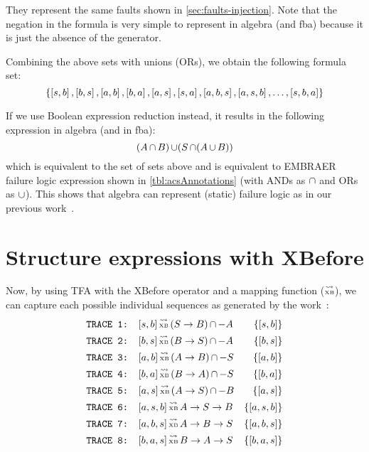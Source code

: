 \documentclass[en,twoside,onehalfspacing,phd]{risethesis}
\newcommand{\EMBRAER}{EMBRAER\xspace}
\def\xbeforeop{\ensuremath\rightarrow}
\newcommand{\xbefore}[2]{\ensuremath #1 \xbeforeop #2 }
\def\tracetoalgebra{\ensuremath\operatorname{\stackrel{\leadsto}{\text{\tiny XB}}}}
\newcommand{\listsin}[1]{\ensuremath\left[ #1 \right]}
\newcommand{\parsin}[1]{\ensuremath\left( #1 \right)}
\def\union{\ensuremath\operatorname{\cup}}
\def\inter{\ensuremath\operatorname{\cap}}
\begin{document}
They represent the same faults shown in \cref{sec:faults-injection}.
Note that the negation in the formula is very simple to represent in \ac{algebra} (and \ac{fba}) because it is just the absence of the generator.

Combining the above sets with unions (ORs), we obtain the following formula set:
%
\[
\left\{ \listsin{s,b}, \listsin{b,s}, \listsin{a,b}, \listsin{b,a}, \listsin{a,s}, \listsin{s,a}, \listsin{a,b,s}, \listsin{a,s,b},\ldots,\listsin{s,b,a} \right\}
\]

If we use Boolean expression reduction instead, it results in the following expression in \ac{algebra} (and in \ac{fba}):
\[
(A \inter B) \union (S \inter (A \union B))
\]
%
which is equivalent to the set of sets above and is equivalent to \EMBRAER failure logic expression shown in \cref{tbl:acsAnnotations} (with ANDs as $\inter$ and ORs as $\union$).
%
This shows that \ac{algebra} can represent (static) failure logic as in our previous work~\cite{DM2012}.

\section{Structure expressions with XBefore}
\label{sec:case-study-xbefore}

Now, by using TFA with the XBefore operator and a mapping function ($\tracetoalgebra$), we can capture each possible individual sequences as generated by the work~\cite{DM2012}:
%
\begin{align*}
\text{\texttt{TRACE 1: }}&[s,b] \tracetoalgebra \parsin{\xbefore{S}{B}} \inter -A & \left\{[s,b]\right\}\\
\text{\texttt{TRACE 2: }}&[b,s] \tracetoalgebra \parsin{\xbefore{B}{S}} \inter -A & \left\{[b,s]\right\}\\
\text{\texttt{TRACE 3: }}&[a,b] \tracetoalgebra \parsin{\xbefore{A}{B}} \inter -S & \left\{[a,b]\right\}\\
\text{\texttt{TRACE 4: }}&[b,a] \tracetoalgebra \parsin{\xbefore{B}{A}} \inter -S & \left\{[b,a]\right\}\\
\text{\texttt{TRACE 5: }}&[a,s] \tracetoalgebra \parsin{\xbefore{A}{S}} \inter -B & \left\{[a,s]\right\}\\
\text{\texttt{TRACE 6: }}&[a,s,b] \tracetoalgebra \xbefore{\xbefore{A}{S}}{B} & \left\{[a,s,b]\right\}\\
\text{\texttt{TRACE 7: }}&[a,b,s] \tracetoalgebra \xbefore{\xbefore{A}{B}}{S} & \left\{[a,b,s]\right\}\\
\text{\texttt{TRACE 8: }}&[b,a,s] \tracetoalgebra \xbefore{\xbefore{B}{A}}{S} & \left\{[b,a,s]\right\}
\end{align*}
\end{document}
